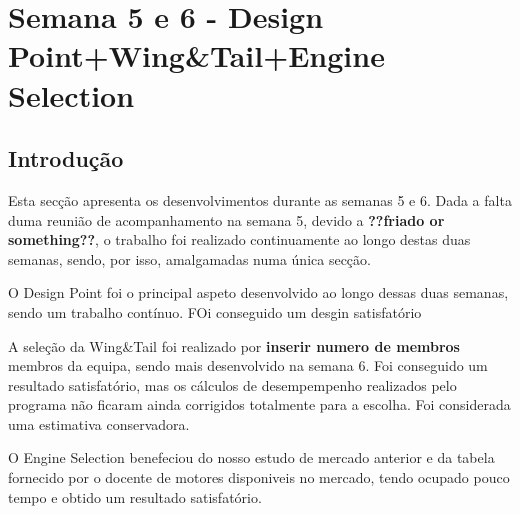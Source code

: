 \section{Semana 5 e 6 - Design Point+Wing\&Tail+Engine Selection}
\subsection{Introdução}
Esta secção apresenta os desenvolvimentos durante as semanas 5 e 6. Dada a falta duma reunião de acompanhamento na semana 5, devido a \textbf{??friado or something??}, o trabalho foi realizado continuamente ao longo destas duas semanas, sendo, por isso, amalgamadas numa única secção.\par
O Design Point foi o principal aspeto desenvolvido ao longo dessas duas semanas, sendo um trabalho contínuo. FOi conseguido um desgin satisfatório\par
A seleção da Wing\&Tail foi realizado por \textbf{inserir numero de membros} membros da equipa, sendo mais desenvolvido na semana 6. Foi conseguido um resultado satisfatório, mas os cálculos de desempempenho realizados pelo programa não ficaram ainda corrigidos totalmente para a escolha. Foi considerada uma estimativa conservadora.\par
O Engine Selection benefeciou do nosso estudo de mercado anterior e da tabela fornecido por o docente de motores disponiveis no mercado, tendo ocupado pouco tempo e obtido um resultado satisfatório.\par

